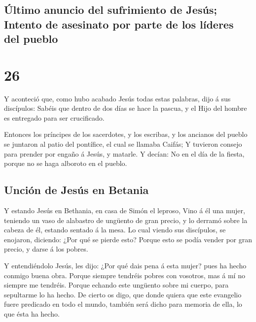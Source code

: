\hypertarget{uxfaltimo-anuncio-del-sufrimiento-de-jesuxfas-intento-de-asesinato-por-parte-de-los-luxedderes-del-pueblo}{%
\subsection{Último anuncio del sufrimiento de Jesús; Intento de
asesinato por parte de los líderes del
pueblo}\label{uxfaltimo-anuncio-del-sufrimiento-de-jesuxfas-intento-de-asesinato-por-parte-de-los-luxedderes-del-pueblo}}

\hypertarget{section-40-26}{%
\section{26}\label{section-40-26}}

 Y aconteció que, como hubo acabado Jesús todas estas
palabras, dijo á sus discípulos:  Sabéis que dentro de dos
días se hace la pascua, y el Hijo del hombre es entregado para ser
crucificado.

 Entonces los príncipes de los sacerdotes, y los escribas,
y los ancianos del pueblo se juntaron al patio del pontífice, el cual se
llamaba Caifás;  Y tuvieron consejo para prender por
engaño á Jesús, y matarle.  Y decían: No en el día de la
fiesta, porque no se haga alboroto en el pueblo.

\hypertarget{unciuxf3n-de-jesuxfas-en-betania}{%
\subsection{Unción de Jesús en
Betania}\label{unciuxf3n-de-jesuxfas-en-betania}}

 Y estando Jesús en Bethania, en casa de Simón el leproso,
 Vino á él una mujer, teniendo un vaso de alabastro de
ungüento de gran precio, y lo derramó sobre la cabeza de él, estando
sentado á la mesa.  Lo cual viendo sus discípulos, se
enojaron, diciendo: ¿Por qué se pierde esto?  Porque esto
se podía vender por gran precio, y darse á los pobres.

 Y entendiéndolo Jesús, les dijo: ¿Por qué dais pena á
esta mujer? pues ha hecho conmigo buena obra.  Porque
siempre tendréis pobres con vosotros, mas á mí no siempre me tendréis.
 Porque echando este ungüento sobre mi cuerpo, para
sepultarme lo ha hecho.  De cierto os digo, que donde
quiera que este evangelio fuere predicado en todo el mundo, también será
dicho para memoria de ella, lo que ésta ha hecho.

